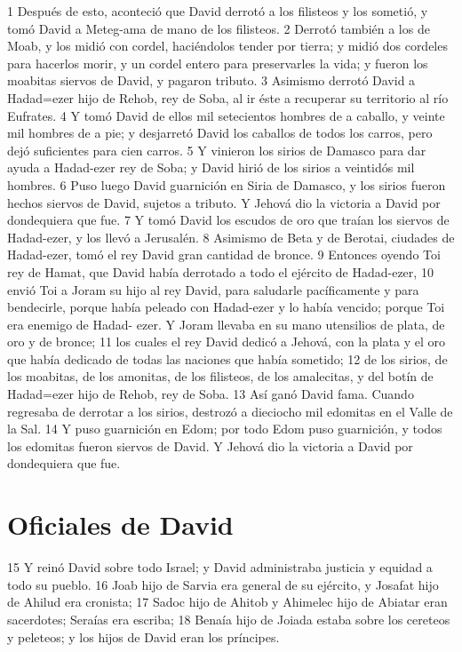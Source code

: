 1 Después de esto, aconteció que David derrotó a los filisteos y los sometió, y tomó David a Meteg-ama de mano de los filisteos.
2 Derrotó también a los de Moab, y los midió con cordel, haciéndolos tender por tierra; y midió dos cordeles para hacerlos morir, y un cordel entero para preservarles la vida; y fueron los moabitas siervos de David, y pagaron tributo.
3 Asimismo derrotó David a Hadad=ezer hijo de Rehob, rey de Soba, al ir éste a recuperar su territorio al río Eufrates.
4 Y tomó David de ellos mil setecientos hombres de a caballo, y veinte mil hombres de a pie; y desjarretó David los caballos de todos los carros, pero dejó suficientes para cien carros.
5 Y vinieron los sirios de Damasco para dar ayuda a Hadad-ezer rey de Soba; y David hirió de los sirios a veintidós mil hombres.
6 Puso luego David guarnición en Siria de Damasco, y los sirios fueron hechos siervos de David, sujetos a tributo. Y Jehová dio la victoria a David por dondequiera que fue.
7 Y tomó David los escudos de oro que traían los siervos de Hadad-ezer, y los llevó a Jerusalén.
8 Asimismo de Beta y de Berotai, ciudades de Hadad-ezer, tomó el rey David gran cantidad de bronce.
9 Entonces oyendo Toi rey de Hamat, que David había derrotado a todo el ejército de Hadad-ezer,
10 envió Toi a Joram su hijo al rey David, para saludarle pacíficamente y para bendecirle, porque había peleado con Hadad-ezer y lo había vencido; porque Toi era enemigo de Hadad- ezer. Y Joram llevaba en su mano utensilios de plata, de oro y de bronce;
11 los cuales el rey David dedicó a Jehová, con la plata y el oro que había dedicado de todas las naciones que había sometido;
12 de los sirios, de los moabitas, de los amonitas, de los filisteos, de los amalecitas, y del botín de Hadad=ezer hijo de Rehob, rey de Soba.
13 Así ganó David fama. Cuando regresaba de derrotar a los sirios, destrozó a dieciocho mil edomitas en el Valle de la Sal. 
14 Y puso guarnición en Edom; por todo Edom puso guarnición, y todos los edomitas fueron siervos de David. Y Jehová dio la victoria a David por dondequiera que fue.

\section*{Oficiales de David}

15 Y reinó David sobre todo Israel; y David administraba justicia y equidad a todo su pueblo.
16 Joab hijo de Sarvia era general de su ejército, y Josafat hijo de Ahilud era cronista;
17 Sadoc hijo de Ahitob y Ahimelec hijo de Abiatar eran sacerdotes; Seraías era escriba;
18 Benaía hijo de Joiada estaba sobre los cereteos y peleteos; y los hijos de David eran los príncipes.

